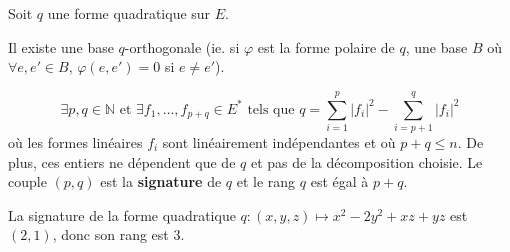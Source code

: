 	
	Soit $q$ une forme quadratique sur $E$.
	
	\begin{lemma}
		Il existe une base $q$-orthogonale (ie. si $\varphi$ est la forme polaire de $q$, une base $B$ où $\forall e, e' \in B, \, \varphi(e, e') = 0$ si $e \neq e'$).
	\end{lemma}
	
	
	\begin{theorem}
		\[ \exists p, q \in \mathbb{N} \text{ et } \exists f_1, \dots, f_{p+q} \in E^* \text{ tels que } q = \sum_{i=1}^p |f_i|^2 - \sum_{i=p+1}^q |f_i|^2 \]
		où les formes linéaires $f_i$ sont linéairement indépendantes et où $p + q \leq n$. De plus, ces entiers ne dépendent que de $q$ et pas de la décomposition choisie.
		\newpar
		Le couple $(p,q)$ est la \textbf{signature} de $q$ et le rang $q$ est égal à $p+q$.
	\end{theorem}
	
	\begin{example}
		La signature de la forme quadratique $q : (x,y,z) \mapsto x^2 - 2y^2 + xz + yz$ est $(2,1)$, donc son rang est $3$.
	\end{example}

